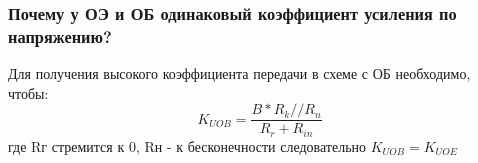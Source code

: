 \subsubsection{Почему у ОЭ и ОБ одинаковый коэффициент усиления по напряжению?}

Для получения высокого коэффициента передачи в схеме с ОБ необходимо, чтобы:
$$
K_{UOB}=\frac{B*R_{k}//R_{n}}{R_{r}+R_{in}}
$$
где Rг стремится к 0, Rн - к бесконечности
следовательно $ K_{UOB}=K_{UOE} $
